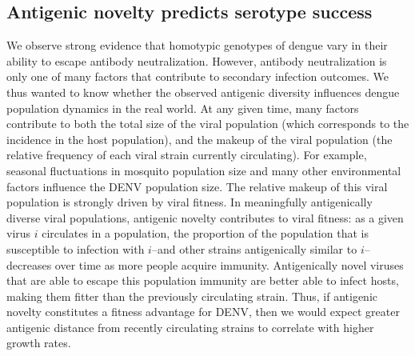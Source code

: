 \documentclass[11pt,oneside,letterpaper]{article}
\begin{document}
\subsection{Antigenic novelty predicts serotype success}
We observe strong evidence that homotypic genotypes of dengue vary in their ability to escape antibody neutralization.
However, antibody neutralization is only one of many factors that contribute to secondary infection outcomes.
We thus wanted to know whether the observed antigenic diversity influences dengue population dynamics in the real world.
At any given time, many factors contribute to both the total size of the viral population (which corresponds to the incidence in the host population), and the makeup of the viral population (the relative frequency of each viral strain currently circulating).
For example, seasonal fluctuations in mosquito population size and many other environmental factors influence the DENV population size.
The relative makeup of this viral population is strongly driven by viral fitness.
In meaningfully antigenically diverse viral populations, antigenic novelty contributes to viral fitness: as a given virus $i$ circulates in a population, the proportion of the population that is susceptible to infection with $i$--and other strains antigenically similar to $i$--decreases over time as more people acquire immunity.
Antigenically novel viruses that are able to escape this population immunity are better able to infect hosts, making them fitter than the previously circulating strain.
Thus, if antigenic novelty constitutes a fitness advantage for DENV, then we would expect greater antigenic distance from recently circulating strains to correlate with higher growth rates.
\end{document}

